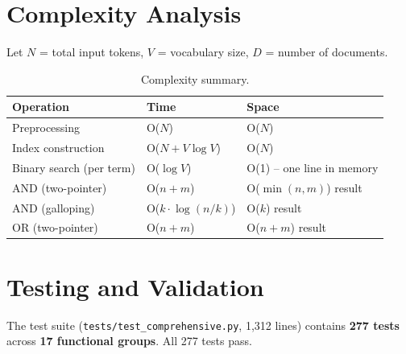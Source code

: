 \documentclass[12pt,a4paper]{article}
\begin{document}
\section{Complexity Analysis}
\label{sec:complexity}

Let $N$ = total input tokens, $V$ = vocabulary size, $D$ = number of documents.

\begin{table}[H]
\centering\small
\caption{Complexity summary.}
\begin{tabular}{@{}l l l@{}}
\toprule
\textbf{Operation} & \textbf{Time} & \textbf{Space} \\
\midrule
Preprocessing & O($N$) & O($N$) \\
Index construction & O($N + V \log V$) & O($N$) \\
Binary search (per term) & O($\log V$) & O(1) -- one line in memory \\
AND (two-pointer) & O($n + m$) & O($\min(n,m)$) result \\
AND (galloping) & O($k \cdot \log(n/k)$) & O($k$) result \\
OR (two-pointer) & O($n + m$) & O($n + m$) result \\
\bottomrule
\end{tabular}
\end{table}

\section{Testing and Validation}
\label{sec:testing}

The test suite (\texttt{tests/test\_comprehensive.py}, 1,312 lines) contains
\textbf{277 tests} across \textbf{17 functional groups}.  All 277 tests pass.
\end{document}
